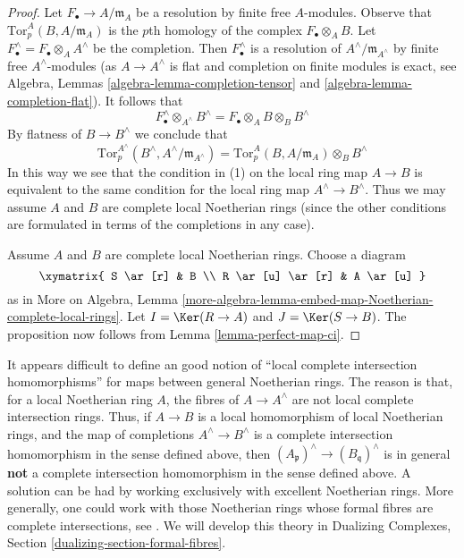 \begin{proof}
Let $F_\bullet \to A/\mathfrak m_A$ be a resolution by finite
free $A$-modules. Observe that
$\text{Tor}^A_p(B, A/\mathfrak m_A)$
is the $p$th homology of the complex $F_\bullet \otimes_A B$.
Let $F_\bullet^\wedge = F_\bullet \otimes_A A^\wedge$ be the completion.
Then $F_\bullet^\wedge$ is a resolution of $A^\wedge/\mathfrak m_{A^\wedge}$
by finite free $A^\wedge$-modules (as $A \to A^\wedge$ is flat and completion
on finite modules is exact, see
Algebra, Lemmas \ref{algebra-lemma-completion-tensor} and
\ref{algebra-lemma-completion-flat}).
It follows that
$$
F_\bullet^\wedge \otimes_{A^\wedge} B^\wedge =
F_\bullet \otimes_A B \otimes_B B^\wedge
$$
By flatness of $B \to B^\wedge$ we conclude that
$$
\text{Tor}^{A^\wedge}_p(B^\wedge, A^\wedge/\mathfrak m_{A^\wedge}) =
\text{Tor}^A_p(B, A/\mathfrak m_A) \otimes_B B^\wedge
$$
In this way we see that the condition in (1) on the local ring map $A \to B$
is equivalent to the same condition for the local ring map
$A^\wedge \to B^\wedge$.
Thus we may assume $A$ and $B$ are complete local Noetherian rings
(since the other conditions are formulated in terms of the completions
in any case).

\medskip\noindent
Assume $A$ and $B$ are complete local Noetherian rings.
Choose a diagram
$$
\xymatrix{
S \ar[r] & B \\
R \ar[u] \ar[r] & A \ar[u]
}
$$
as in More on Algebra, Lemma
\ref{more-algebra-lemma-embed-map-Noetherian-complete-local-rings}.
Let $I = \Ker(R \to A)$ and $J = \Ker(S \to B)$.
The proposition now follows from Lemma \ref{lemma-perfect-map-ci}.
\end{proof}

\begin{remark}
\label{remark-no-good-ci-map}
It appears difficult to define an good notion of ``local complete
intersection homomorphisms'' for maps between general Noetherian rings.
The reason is that, for a local Noetherian ring $A$, the fibres of
$A \to A^\wedge$ are not local complete intersection rings.
Thus, if $A \to B$ is a local homomorphism of local Noetherian rings,
and the map of completions $A^\wedge \to B^\wedge$ is a
complete intersection homomorphism in the sense defined above,
then $(A_\mathfrak p)^\wedge \to (B_\mathfrak q)^\wedge$ is in general
{\bf not} a complete intersection homomorphism in the sense
defined above. A solution can be had by working exclusively with
excellent Noetherian rings. More generally, one could work with
those Noetherian rings whose formal fibres are complete
intersections, see \cite{Rodicio-ci}.
We will develop this theory in
Dualizing Complexes, Section \ref{dualizing-section-formal-fibres}.
\end{remark}

